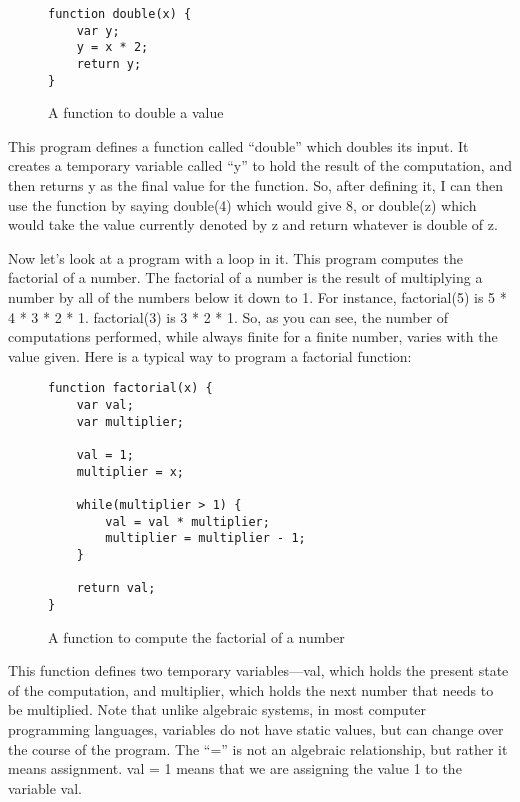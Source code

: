 \begin{figure}[H]
\begin{mdframed}
\begin{verbatim}
function double(x) {
	var y;
	y = x * 2;
	return y;
}
\end{verbatim}
\end{mdframed}
\caption{A function to double a value}
\end{figure}

This program defines a function called ``double'' which doubles its input.  It creates a temporary variable called ``y'' to hold the result of the computation, and then returns y as the final value for the function.  So, after defining it, I can then use the function by saying double(4) which would give 8, or double(z) which would take the value currently denoted by z and return whatever is double of z.

Now let's look at a program with a loop in it.  This program computes the factorial of a number.  The factorial of a number is the result of multiplying a number by all of the numbers below it down to 1.  For instance, factorial(5) is 5 * 4 * 3 * 2 * 1.  factorial(3) is 3 * 2 * 1.  So, as you can see, the number of computations performed, while always finite for a finite number, varies with the value given.  Here is a typical way to program a factorial function:

\begin{figure}[H]
\begin{mdframed}
\begin{verbatim}
function factorial(x) {
	var val;
	var multiplier;

	val = 1;
	multiplier = x;

	while(multiplier > 1) {
		val = val * multiplier;
		multiplier = multiplier - 1;
	}

	return val;
}
\end{verbatim}
\end{mdframed}
\caption{A function to compute the factorial of a number}
\end{figure}

This function defines two temporary variables---val, which holds the present state of the computation, and multiplier, which holds the next number that needs to be multiplied.  Note that unlike algebraic systems, in most computer programming languages, variables do not have static values, but can change over the course of the program.  The ``='' is not an algebraic relationship, but rather it means assignment.  val = 1 means that we are assigning the value 1 to the variable val.  

